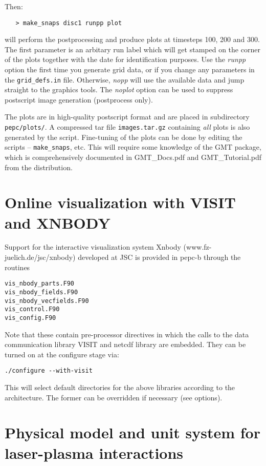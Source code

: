 \documentclass[11pt,psfig]{article}
\newcommand{\meno}{{\medskip\noindent}}
\begin{document}
\noindent
Then:

\begin{verbatim}
   > make_snaps disc1 runpp plot
\end{verbatim}

\noindent
will perform the postprocessing and produce plots at timesteps 100, 200
and 300.  The first parameter is an arbitary run label which will get stamped
on the corner of the plots together with the date for identification purposes.
Use the \textit{runpp} option the first time you generate grid data, or if you change
any parameters in the \texttt{grid_defs.in} file.  Otherwise, \textit{nopp} will use the available
data and jump straight to the graphics tools.  The \textit{noplot} option can be used to
suppress postscript image generation (postprocess only).

\meno
The plots are in high-quality postscript format and are placed in subdirectory 
\texttt{pepc/plots/}.
A compressed tar file \texttt{images.tar.gz} containing \textit{all} plots is also generated by the script.
Fine-tuning of the plots can be done by editing the scripts --
\texttt{make_snaps}, etc.  This will require some knowledge of the GMT package, which is
comprehensively documented in GMT_Docs.pdf and GMT_Tutorial.pdf from the distribution.

\section{Online visualization with VISIT and XNBODY}
Support for the interactive visualization system Xnbody (www.fz-juelich.de/jsc/xnbody) developed at JSC is
provided in pepc-b through the routines 
\begin{verbatim}
vis_nbody_parts.F90
vis_nbody_fields.F90
vis_nbody_vecfields.F90
vis_control.F90
vis_config.F90
\end{verbatim}
Note that these contain pre-processor directives in which the calls to the data communication library VISIT and netcdf library are embedded.
They can be turned on at the configure stage via:

\begin{verbatim}
./configure --with-visit
\end{verbatim}

This will select default directories for the above libraries according to the architecture.  The former can be overridden if necessary (see options).



\section{Physical model and unit system for laser-plasma interactions}
\end{document}
